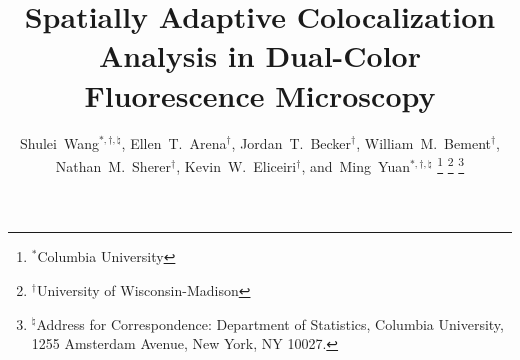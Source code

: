 \documentclass[10pt,twocolumn,twoside]{IEEEtran}
\begin{document}
%
\title{Spatially Adaptive Colocalization Analysis in Dual-Color Fluorescence Microscopy}
%
%
%

\author{Shulei~Wang$^{\ast,\dag,\natural}$,
        Ellen~T.~Arena$^\dag$,
        Jordan~T.~Becker$^\dag$,
        William~M.~Bement$^\dag$,\\
        Nathan~M.~Sherer$^\dag$,
        Kevin~W.~Eliceiri$^\dag$,
        and~Ming~Yuan$^{\ast,\dag,\natural}$ %
\thanks{$^\ast$Columbia University}
\thanks{$^\dag$University of Wisconsin-Madison}
\thanks{$^\natural$Address for Correspondence: Department of Statistics, Columbia University, 1255 Amsterdam Avenue, New York, NY 10027.}}

% 
%
\end{document}
